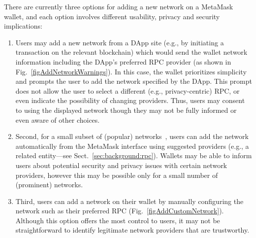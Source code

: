 \documentclass[conference]{IEEEtran}
\begin{document}
There are currently three options for adding a new network on a MetaMask wallet, and each option involves different usability, privacy and security implications:
\begin{enumerate}
    \item Users may add a new network from a DApp site (e.g., by initiating a transaction on the relevant blockchain) which would send the wallet network information including the DApp's preferred \ac*{RPC} provider (as shown in Fig.~\ref{figAddNetworkWarnings}). In this case, the wallet prioritizes simplicity and prompts the user to add the network specified by the DApp. This prompt does not allow the user to select a different (e.g., privacy-centric) \ac*{RPC}, or even indicate the possibility of changing providers. Thus, users may consent to using the displayed network though they may not be fully informed or even aware of other choices. %

    \item Second, for a small subset of (popular) networks~\cite{metamaskAddCustomNetwork}, users can add the network automatically from the MetaMask interface using suggested providers (e.g., a related entity---see Sect.~\ref{sec:background:rpc}). %
    Wallets may be able to inform users about potential security and privacy issues with certain network providers, however this may be possible only for a small number of (prominent) networks. %

    \item Third, users can add a network on their wallet by manually configuring the network such as their preferred \ac*{RPC} (Fig.~\ref{figAddCustomNetwork}). Although this option offers the most control to users, it may not be straightforward to identify legitimate network providers that are trustworthy. %
\end{enumerate}
\end{document}

